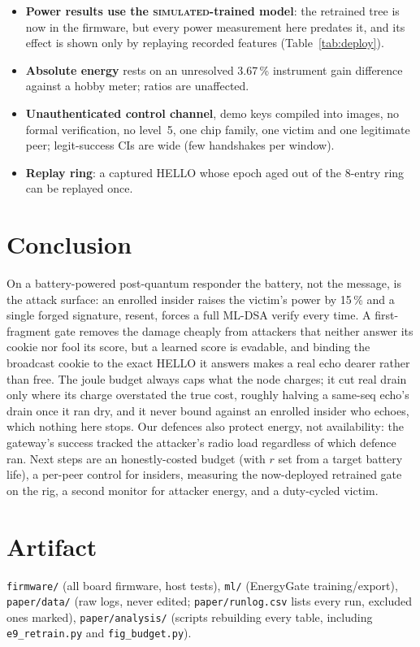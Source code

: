 \documentclass[conference]{IEEEtran}
\newcommand{\simu}{\textsc{simulated}}
\begin{document}
\begin{itemize}
traces predate it and contain no same-seq echo.
\item \textbf{Power results use the \simu{}-trained model}: the retrained tree is now in the firmware, but every
power measurement here predates it, and its effect is shown only by replaying recorded features
(Table~\ref{tab:deploy}).
\item \textbf{Absolute energy} rests on an unresolved 3.67\,\% instrument gain difference against a hobby meter;
ratios are unaffected.
\item \textbf{Unauthenticated control channel}, demo keys compiled into images, no formal verification, no level~5,
one chip family, one victim and one legitimate peer; legit-success CIs are wide (few handshakes per window).
\item \textbf{Replay ring}: a captured HELLO whose epoch aged out of the 8-entry ring can be replayed once.
\end{itemize}

\section{Conclusion}
On a battery-powered post-quantum responder the battery, not the message, is the attack surface: an enrolled
insider raises the victim's power by 15\,\% and a single forged signature, resent, forces a full ML-DSA verify every
time. A first-fragment gate removes the damage cheaply from attackers that neither answer its cookie nor fool its
score, but a learned score is evadable, and binding the broadcast cookie to the exact HELLO it answers makes a real echo dearer rather
than free. The joule budget always caps what the node charges; it cut real drain only where its charge overstated
the true cost, roughly halving a same-seq echo's drain once it ran dry, and it never bound against an enrolled
insider who echoes, which nothing here stops. Our defences also protect energy, not availability: the gateway's
success tracked the attacker's radio load regardless of which defence ran. Next steps are an honestly-costed budget
(with $r$ set from a target battery life), a per-peer control for insiders, measuring the now-deployed retrained gate on the rig, a second
monitor for attacker energy, and a duty-cycled victim.

\section*{Artifact}
\texttt{firmware/} (all board firmware, host tests), \texttt{ml/} (EnergyGate training/export),
\texttt{paper/data/} (raw logs, never edited; \texttt{paper/runlog.csv} lists every run, excluded ones marked),
\texttt{paper/analysis/} (scripts rebuilding every table, including \texttt{e9\_retrain.py} and
\texttt{fig\_budget.py}).
\end{document}
